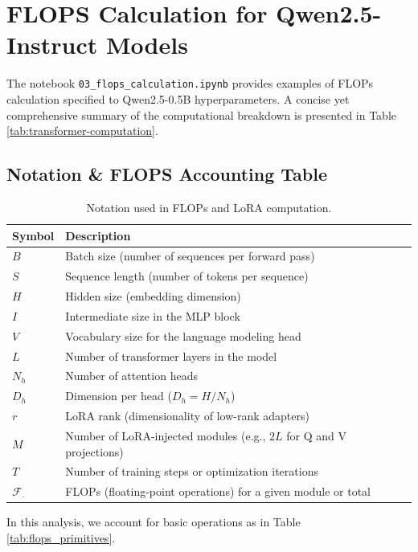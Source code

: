 \documentclass[11pt]{article}
\begin{document}
\section{FLOPS Calculation for Qwen2.5-Instruct Models}

The notebook \texttt{03\_flops\_calculation.ipynb} provides examples of FLOPs calculation specified to Qwen2.5-0.5B hyperparameters. A concise yet comprehensive summary of the computational breakdown is presented in Table \ref{tab:transformer-computation}.

\subsection*{Notation \& FLOPS Accounting Table}

\begin{table}[h!]
\centering
\renewcommand{\arraystretch}{1.2}
\begin{tabular}{ll}
\toprule
\textbf{Symbol} & \textbf{Description} \\
\midrule
$B$ & Batch size (number of sequences per forward pass) \\
$S$ & Sequence length (number of tokens per sequence) \\
$H$ & Hidden size (embedding dimension) \\
$I$ & Intermediate size in the MLP block \\
$V$ & Vocabulary size for the language modeling head \\
$L$ & Number of transformer layers in the model \\
$N_h$ & Number of attention heads \\
$D_h$ & Dimension per head ($D_h = H / N_h$) \\
$r$ & LoRA rank (dimensionality of low-rank adapters) \\
$M$ & Number of LoRA-injected modules (e.g., $2L$ for Q and V projections) \\
$T$ & Number of training steps or optimization iterations \\
$\mathcal{F}_{\cdot}$ & FLOPs (floating-point operations) for a given module or total \\
\bottomrule
\end{tabular}
\caption{Notation used in FLOPs and LoRA computation.}
\label{tab:flops-notation}
\end{table}

In this analysis, we account for basic operations as in Table \ref{tab:flops_primitives}.
\end{document}
